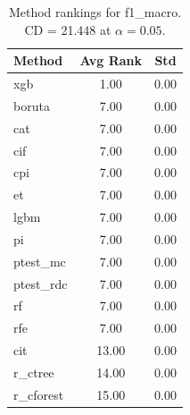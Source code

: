\begin{table}[h]
\centering
\caption{Method rankings for f1_macro. CD = 21.448 at $\alpha=0.05$.}
\label{tab:ranks_f1_macro}
\begin{tabular}{lcc}
\toprule
Method & Avg Rank & Std \\
\midrule
xgb & 1.00 & 0.00 \\
boruta & 7.00 & 0.00 \\
cat & 7.00 & 0.00 \\
cif & 7.00 & 0.00 \\
cpi & 7.00 & 0.00 \\
et & 7.00 & 0.00 \\
lgbm & 7.00 & 0.00 \\
pi & 7.00 & 0.00 \\
ptest_mc & 7.00 & 0.00 \\
ptest_rdc & 7.00 & 0.00 \\
rf & 7.00 & 0.00 \\
rfe & 7.00 & 0.00 \\
cit & 13.00 & 0.00 \\
r_ctree & 14.00 & 0.00 \\
r_cforest & 15.00 & 0.00 \\
\bottomrule
\end{tabular}
\end{table}